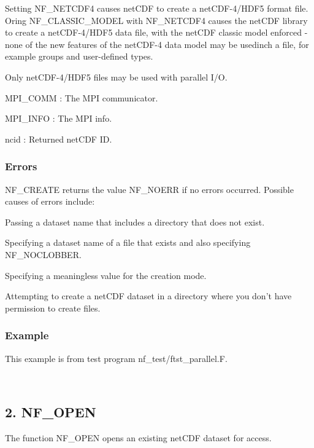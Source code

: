 Setting N\+F\+\_\+\+N\+E\+T\+C\+D\+F4 causes net\+C\+DF to create a net\+C\+D\+F-\/4/\+H\+D\+F5 format file. Oring N\+F\+\_\+\+C\+L\+A\+S\+S\+I\+C\+\_\+\+M\+O\+D\+EL with N\+F\+\_\+\+N\+E\+T\+C\+D\+F4 causes the net\+C\+DF library to create a net\+C\+D\+F-\/4/\+H\+D\+F5 data file, with the net\+C\+DF classic model enforced -\/ none of the new features of the net\+C\+D\+F-\/4 data model may be usedinch a file, for example groups and user-\/defined types.

Only net\+C\+D\+F-\/4/\+H\+D\+F5 files may be used with parallel I/O.

{\ttfamily M\+P\+I\+\_\+\+C\+O\+MM} \+: The M\+PI communicator.

{\ttfamily M\+P\+I\+\_\+\+I\+N\+FO} \+: The M\+PI info.

{\ttfamily ncid} \+: Returned net\+C\+DF ID.

\subsubsection*{Errors}

N\+F\+\_\+\+C\+R\+E\+A\+TE returns the value N\+F\+\_\+\+N\+O\+E\+RR if no errors occurred. Possible causes of errors include\+:


\begin{DoxyItemize}
\item Passing a dataset name that includes a directory that does not exist.
\item Specifying a dataset name of a file that exists and also specifying N\+F\+\_\+\+N\+O\+C\+L\+O\+B\+B\+ER.
\item Specifying a meaningless value for the creation mode.
\item Attempting to create a net\+C\+DF dataset in a directory where you don’t have permission to create files.
\end{DoxyItemize}

\subsubsection*{Example}

This example is from test program nf\+\_\+test/ftst\+\_\+parallel.\+F.

 


\hypertarget{nc_f77_interface_guide_f77_NF_OPEN_}{}\subsection{2. N\+F\+\_\+\+O\+P\+E\+N  }\label{nc_f77_interface_guide_f77_NF_OPEN_}
The function N\+F\+\_\+\+O\+P\+EN opens an existing net\+C\+DF dataset for access.

